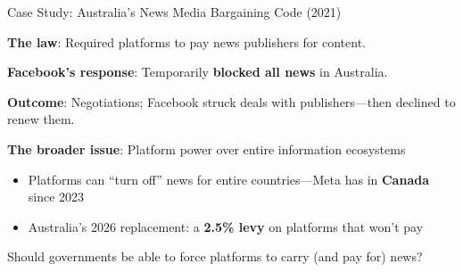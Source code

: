 ﻿\documentclass[aspectratio=169,11pt]{beamer}
\begin{document}
\begin{frame}{Case Study: Australia's News Media Bargaining Code (2021)}
\begin{casestudybox}
\textbf{The law}: Required platforms to pay news publishers for content.

\textbf{Facebook's response}: Temporarily \textbf{blocked all news} in Australia.

\textbf{Outcome}: Negotiations; Facebook struck deals with publishers---then declined to renew them.
\end{casestudybox}

\vspace{0.3cm}
\textbf{The broader issue}: Platform power over entire information ecosystems

\begin{itemize}
    \item Platforms can ``turn off'' news for entire countries---Meta has in \textbf{Canada} since 2023
    \item Australia's 2026 replacement: a \textbf{2.5\% levy} on platforms that won't pay
\end{itemize}

\begin{discussionbox}[Discussion]
Should governments be able to force platforms to carry (and pay for) news?
\end{discussionbox}
\end{frame}
\end{document}
